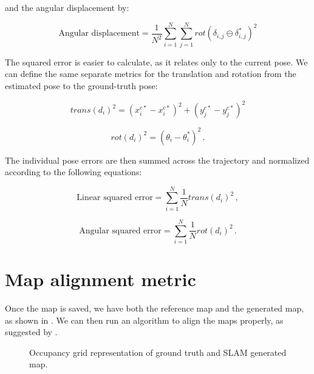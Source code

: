 \noindent and the angular displacement by:

\begin{equation}
\text{Angular displacement} = \frac{1}{N^2} \sum_{i = 1}^N \sum_{j = 1}^N rot(\delta_{i,j} \ominus \delta_{i,j}^*)^2
\end{equation}

The squared error is easier to calculate, as it relates only to the current pose. We can define the same separate metrics for the translation and rotation from the estimated pose to the ground-truth pose:

\begin{equation}
trans(d_i)^2 = (x^{c*}_i - x^{c*}_i)^2 + (y^{c*}_j - y^{c*}_j)^2
\end{equation}

\begin{equation}
rot(d_i)^2 = (\theta_i - \theta^*_i)^2 \,.
\end{equation}

The individual pose errors are then summed across the trajectory and normalized according to the following equations:

\begin{equation}
\text{Linear squared error} = \sum_{i=1}^N \frac{1}{N} trans(d_i)^2 \,,
\end{equation}

\begin{equation}
\text{Angular squared error} = \sum_{i=1}^N \frac{1}{N} rot(d_i)^2 \,.
\end{equation}

\section{Map alignment metric} \label{sec:icp}

Once the map is saved, we have both the reference map and the generated map, as shown in . We can then run an algorithm to align the maps properly, as suggested by \citeauthor{santos2013evaluation}.

\begin{figure}[!ht]
     \centering
     \hspace{2cm}
     \caption{Occupancy grid representation of ground truth and SLAM generated map.}
     \label{fig:reference_map_icp}
\end{figure}

